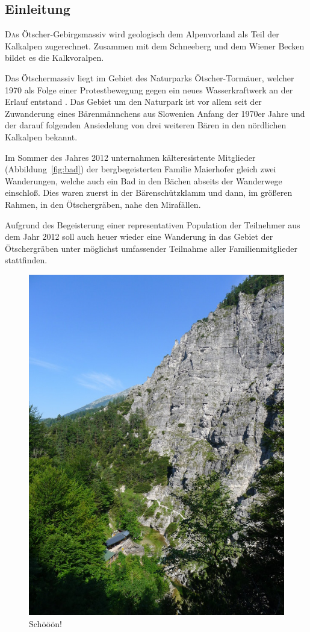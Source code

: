 \documentclass[twoside]{article}
\begin{document}
\begin{multicols}{2} %

\section{Einleitung}

\lettrine[nindent=0em,lines=3]{D} as Ötscher-Gebirgsmassiv wird geologisch dem Alpenvorland als Teil der
Kalkalpen zugerechnet. Zusammen mit dem Schneeberg und dem Wiener Becken bildet es die Kalkvoralpen. \cite{SH:2012}

Das Ötschermassiv liegt im Gebiet des Naturparks Ötscher-Tormäuer, welcher 1970 als Folge einer Protestbewegung gegen ein neues Wasserkraftwerk an der Erlauf
entstand \cite{NOT:2013:Online}. Das Gebiet um den Naturpark ist vor allem seit der Zuwanderung eines Bärenmännchens aus Slowenien Anfang der 1970er Jahre und
der darauf folgenden Ansiedelung von drei weiteren Bären in den nördlichen Kalkalpen bekannt.

Im Sommer des Jahres 2012 unternahmen kälteresistente Mitglieder (Abbildung~\ref{fig:bad}) der
bergbegeisterten Familie Maierhofer gleich zwei Wanderungen, welche auch ein Bad in den
Bächen abseits der Wanderwege einschloß. Dies waren zuerst in der Bärenschützklamm und dann, im größeren Rahmen, in den Ötschergräben, nahe den Mirafällen.

Aufgrund des Begeisterung einer representativen Population der Teilnehmer aus dem Jahr 2012 soll auch heuer wieder eine Wanderung in das Gebiet der
Ötschergräben unter möglichst umfassender Teilnahme aller Familienmitglieder stattfinden.
\begin{figure}[H]
\begin{center}
  \includegraphics[trim = 0 15 0 0, clip, natwidth=600, natheight=800, width=.45\textwidth]{Figures/oetschergraeben.jpg}
\end{center}
\caption{Schööön!}
\label{fig:oetschergraeben}
\end{figure}


\end{multicols}
\end{document}
